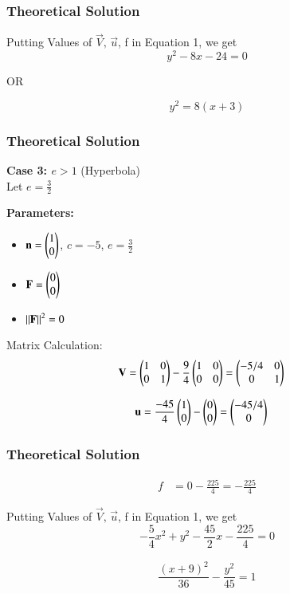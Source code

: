 \documentclass{beamer}
\begin{document}
\begin{frame}[fragile]
    \frametitle{Theoretical Solution}
Putting Values of $\vec{V}, \, \vec{u}$, f in Equation 1, we get
\begin{equation}
y^2 - 8x - 24 = 0
\end{equation}

\begin{center}
    OR
\end{center}

\begin{equation}
\boxed{y^2 = 8(x + 3)}
\end{equation}
\end{frame}

\begin{frame}[fragile]
    \frametitle{Theoretical Solution}
    \textbf{Case 3: $e > 1$} (Hyperbola)\\
Let $e = \frac{3}{2}$

\textbf{Parameters:}
\begin{itemize}
\item $\mathbf{n} = \begin{pmatrix}1 \\ 0\end{pmatrix}$, $c = -5$, $e = \frac{3}{2}$
\item $\mathbf{F} = \begin{pmatrix}0 \\ 0\end{pmatrix}$
\item $\left\lVert\mathbf{F}\right\rVert^2 = 0$
\end{itemize}
Matrix Calculation:
\begin{align}
\mathbf{V} &= \begin{pmatrix}1 & 0 \\ 0 & 1\end{pmatrix} - \frac{9}{4}\begin{pmatrix}1 & 0 \\ 0 & 0\end{pmatrix} = \begin{pmatrix}-5/4 & 0 \\ 0 & 1\end{pmatrix}
\end{align}

\begin{align}
\mathbf{u} &= \frac{-45}{4}\begin{pmatrix}1 \\ 0\end{pmatrix} - \begin{pmatrix}0 \\ 0\end{pmatrix} = \begin{pmatrix}-45/4 \\ 0\end{pmatrix}
\end{align}
\end{frame}

\begin{frame}[fragile]
    \frametitle{Theoretical Solution}
\begin{align}
f &= 0 - \frac{225}{4} = -\frac{225}{4}
\end{align}

Putting Values of $\vec{V}, \, \vec{u}$, f in Equation 1, we get
\begin{equation}
-\frac{5}{4}x^2 + y^2 - \frac{45}{2}x - \frac{225}{4} = 0
\end{equation}

\begin{align}
    \boxed{\dfrac{(x+9)^2}{36} - \dfrac{y^2}{45} = 1}
\end{align}
\end{frame}
\end{document}
